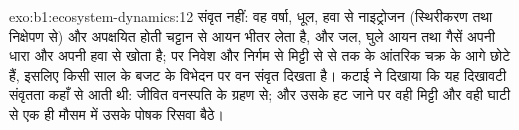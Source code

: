 \begin{solution}{exo:b1:ecosystem-dynamics:12}
संवृत नहीं: वह वर्षा, धूल, हवा से नाइट्रोजन (स्थिरीकरण
तथा निक्षेपण से) और अपक्षयित होती चट्टान से आयन भीतर लेता है, और जल,
घुले आयन तथा गैसें अपनी धारा और अपनी हवा से खोता है; पर
निवेश और निर्गम  से मिट्टी से  से  तक के आंतरिक चक्र के आगे
छोटे हैं, इसलिए किसी साल के बजट के विभेदन पर वन संवृत दिखता है।
कटाई ने दिखाया कि यह दिखावटी संवृतता कहाँ से आती थी: जीवित वनस्पति के
ग्रहण से; और उसके हट जाने पर वही मिट्टी और वही  घाटी से एक ही मौसम
में उसके पोषक रिसवा बैठे।
\end{solution}

